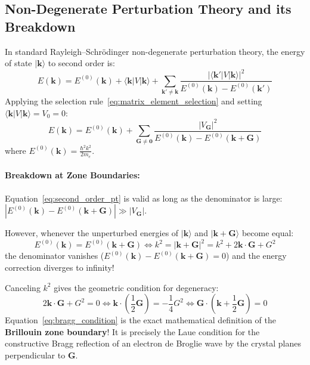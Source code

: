 \documentclass[11pt,a4paper]{article}
\newcommand{\vb}[1]{\mathbf{#1}}
\begin{document}
\subsection{Non-Degenerate Perturbation Theory and its Breakdown}
In standard Rayleigh--Schrödinger non-degenerate perturbation theory, the energy of state $|\vb{k}\rangle$ to second order is:
\begin{equation}
E(\vb{k}) = E^{(0)}(\vb{k}) + \langle \vb{k}|V|\vb{k}\rangle + \sum_{\vb{k}' \neq \vb{k}} \frac{|\langle \vb{k}'|V|\vb{k}\rangle|^2}{E^{(0)}(\vb{k}) - E^{(0)}(\vb{k}')}
\end{equation}
Applying the selection rule~\eqref{eq:matrix_element_selection} and setting $\langle\vb{k}|V|\vb{k}\rangle = V_0 = 0$:
\begin{equation}
E(\vb{k}) = E^{(0)}(\vb{k}) + \sum_{\vb{G} \neq \vb{0}} \frac{|V_{\vb{G}}|^2}{E^{(0)}(\vb{k}) - E^{(0)}(\vb{k}+\vb{G})}
\label{eq:second_order_pt}
\end{equation}
where $E^{(0)}(\vb{k}) = \frac{\hbar^2 k^2}{2m_e}$.

\paragraph{Breakdown at Zone Boundaries:}
Equation~\eqref{eq:second_order_pt} is valid as long as the denominator is large: $|E^{(0)}(\vb{k}) - E^{(0)}(\vb{k}+\vb{G})| \gg |V_{\vb{G}}|$. 

However, whenever the unperturbed energies of $|\vb{k}\rangle$ and $|\vb{k}+\vb{G}\rangle$ become equal:
\begin{equation}
E^{(0)}(\vb{k}) = E^{(0)}(\vb{k}+\vb{G}) \iff k^2 = |\vb{k}+\vb{G}|^2 = k^2 + 2\vb{k}\cdot\vb{G} + G^2
\end{equation}
the denominator vanishes ($E^{(0)}(\vb{k}) - E^{(0)}(\vb{k}+\vb{G}) = 0$) and the energy correction diverges to infinity! 

Canceling $k^2$ gives the geometric condition for degeneracy:
\begin{equation}
2\vb{k}\cdot\vb{G} + G^2 = 0 \iff \boxed{\vb{k}\cdot\left(\frac{1}{2}\vb{G}\right) = -\frac{1}{4}G^2 \iff \vb{G}\cdot\left(\vb{k} + \frac{1}{2}\vb{G}\right) = 0}
\label{eq:bragg_condition}
\end{equation}
Equation~\eqref{eq:bragg_condition} is the exact mathematical definition of the \textbf{Brillouin zone boundary}! It is precisely the Laue condition for the constructive Bragg reflection of an electron de Broglie wave by the crystal planes perpendicular to $\vb{G}$.
\end{document}
